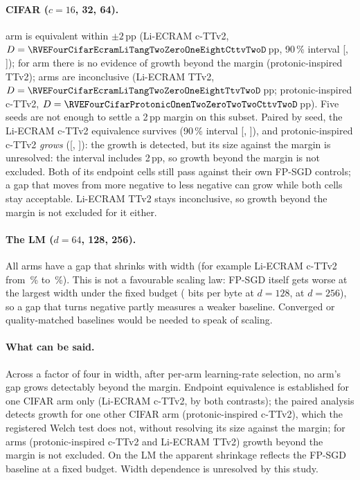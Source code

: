 \paragraph{CIFAR ($c=16$, 32, 64).} \RVEFourCifarNEquivalent{} arm is equivalent within $\pm2$\,pp (Li-ECRAM c-TTv2,
$D=\RVEFourCifarEcramLiTangTwoZeroOneEightCttvTwoD$\,pp, 90\,\% interval [\RVEFourCifarEcramLiTangTwoZeroOneEightCttvTwoLo,
\RVEFourCifarEcramLiTangTwoZeroOneEightCttvTwoHi]); for \RVEFourCifarNNoEvidenceOfGrowthBeyondTheMargin{} arm there is no evidence
of growth beyond the margin (protonic-inspired TTv2); \RVEFourCifarNInconclusive{} arms are inconclusive (Li-ECRAM TTv2,
$D=\RVEFourCifarEcramLiTangTwoZeroOneEightTtvTwoD$\,pp; protonic-inspired c-TTv2, $D=\RVEFourCifarProtonicOnenTwoZeroTwoTwoCttvTwoD$\,pp).
Five seeds are not enough to settle a 2\,pp margin on this subset. Paired by seed, the Li-ECRAM c-TTv2 equivalence survives
(90\,\% interval [\RVEFourCifarEcramLiTangTwoZeroOneEightCttvTwoPairedLo, \RVEFourCifarEcramLiTangTwoZeroOneEightCttvTwoPairedHi]),
and protonic-inspired c-TTv2 \emph{grows} ([\RVEFourCifarProtonicOnenTwoZeroTwoTwoCttvTwoPairedLo,
\RVEFourCifarProtonicOnenTwoZeroTwoTwoCttvTwoPairedHi]): the growth is detected, but its size against the margin is
unresolved: the interval includes 2\,pp, so growth beyond the margin is not excluded. Both of its
endpoint cells still pass against their own FP-SGD controls; a gap that moves from more negative to less negative can grow while
both cells stay acceptable. Li-ECRAM TTv2 stays inconclusive, so growth beyond the margin is not excluded for it either.

\paragraph{The LM ($d=64$, 128, 256).} All \RVEFourLmNShrinks{} arms have a gap that shrinks with width (for example Li-ECRAM
c-TTv2 from \RVEFourLmEcramLiTangTwoZeroOneEightCttvTwoWSixFourGap\,\% to \RVEFourLmEcramLiTangTwoZeroOneEightCttvTwoWTwoFiveSixGap\,\%).
This is not a favourable scaling law: FP-SGD itself gets worse at the largest width under the fixed budget
(\RVEFourLmFpWOneTwoEight{} bits per byte at $d=128$, \RVEFourLmFpWTwoFiveSix{} at $d=256$), so a gap that turns negative partly
measures a weaker baseline. Converged or quality-matched baselines would be needed to speak of scaling.

\paragraph{What can be said.} Across a factor of four in width, after per-arm learning-rate selection, no arm's gap grows
detectably beyond the margin. Endpoint equivalence is established for one CIFAR arm only (Li-ECRAM c-TTv2, by both contrasts);
the paired analysis detects growth for one other CIFAR arm (protonic-inspired c-TTv2), which the registered Welch test
does not, without resolving its size against the margin; for \RYWidthNotExcludedN{} arms (protonic-inspired c-TTv2 and
Li-ECRAM TTv2) growth beyond the margin is not excluded. On the LM the apparent shrinkage reflects the FP-SGD
baseline at a fixed budget. Width dependence is unresolved by this study.


